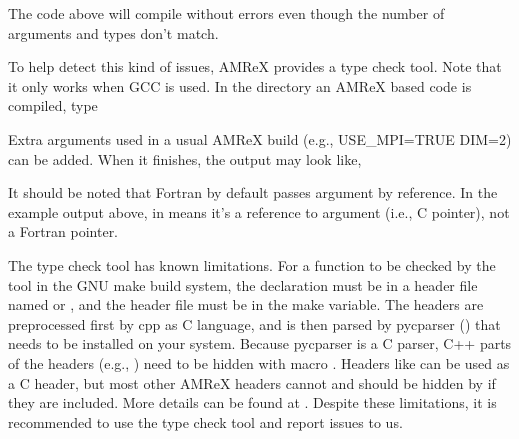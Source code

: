 \documentclass[letterpaper,10pt,english]{sphinxmanual}
\begin{document}
\sphinxAtStartPar
The code above will compile without errors even though the number of
arguments and types don’t match.

\sphinxAtStartPar
To help detect this kind of issues, AMReX provides a type check tool.
Note that it only works when GCC is used.  In the directory an AMReX
based code is compiled, type

\begin{sphinxVerbatim}[commandchars=\\\{\}]
\end{sphinxVerbatim}

\sphinxAtStartPar
Extra arguments used in a usual AMReX build (e.g., USE\_MPI=TRUE DIM=2)
can be added.  When it finishes, the output may look like,

\begin{sphinxVerbatim}[commandchars=\\\{\}]
\end{sphinxVerbatim}

\sphinxAtStartPar
It should be noted that Fortran by default passes argument by
reference.  In the example output above,  in  means it’s a reference to argument
(i.e., C pointer), not a Fortran pointer.

\sphinxAtStartPar
The type check tool has known limitations.  For a function to be
checked by the tool in the GNU make build system, the declaration must
be in a header file named  or , and the header file
must be in the  make variable.  The headers are
preprocessed first by cpp as C language, and is then parsed by
pycparser () that needs to be
installed on your system.  Because pycparser is a C parser, C++ parts
of the headers (e.g., ) need to be hidden with
macro .  Headers like  can
be used as a C header, but most other AMReX headers cannot and should
be hidden by  if they are included.  More
details can be found at .  Despite
these limitations, it is recommended to use the type check tool and
report issues to us.
\end{document}
